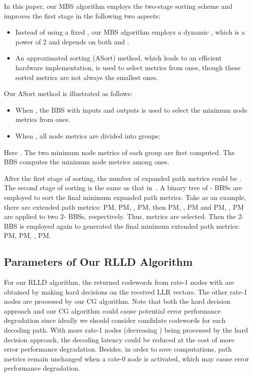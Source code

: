 \documentclass[journal]{IEEEtran}
\begin{document}
In this paper, our MBS algorithm employs the two-stage sorting scheme and improves the first stage in the following two aspects:
\begin{itemize}
\item Instead of using a fixed , our MBS algorithm employs a dynamic , which is a power of 2 and depends on both  and .
\item An approximated sorting (ASort) method, which leads to an efficient hardware implementation, is used to select  metrics from  ones, though these sorted metrics are not always the  smallest ones.
\end{itemize}
Our ASort method is illustrated as follows:
\begin{itemize}
\item When , the BBS with  inputs and  outputs is used to select the  minimum node metrics from  ones.
\item When , all  node metrics are divided into  groups:
\end{itemize}

Here . The two minimum node metrics of each group are first computed. The BBS computes the minimum  node metrics among  ones.

After the first stage of sorting, the number of expanded path metrics  could be . The second stage of sorting is the same as that in~\cite{chenrong_tsp}. A binary tree of - BBSs are employed to sort the final  minimum expanded path metrics. Take  as an example, there are  extended path metrics: PM, PM, , PM, then PM, , PM and PM, , PM are applied to two 2- BBSs, respectively. Thus,  metrics are selected. Then the 2- BBS is employed again to generated the final  minimum extended path metrics: PM, PM, , PM.

\subsection{Parameters of Our RLLD Algorithm} \label{sec: dicus_parameter}
For our RLLD algorithm, the returned codewords from rate-1 nodes with  are obtained by making hard decisions on the received LLR vectors. The other rate-1 nodes are processed by our CG algorithm. Note that both the hard decision approach and our CG algorithm could cause potential error performance degradation since ideally we should consider  candidate codewords for each decoding path. With more rate-1 nodes (decreasing ) being processed by the hard decision approach, the decoding latency could be reduced at the cost of more error performance degradation. Besides, in order to save computations, path metrics remain unchanged when a rate-0 node is activated, which may cause error performance degradation.
\end{document}

